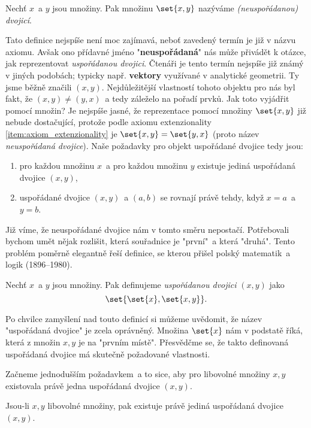 \begin{definition}
    Nechť $x$~a $y$ jsou množiny. Pak množinu $\set{x,y}$ nazýváme \emph{(neuspořádanou) dvojicí}.
\end{definition}
Tato definice nejspíše není moc zajímavá, neboť zavedený termín je již v názvu axiomu. Avšak ono přídavné jméno "\textbf{neuspořádaná}" nás může přivádět k otázce, jak reprezentovat \emph{uspořádanou dvojici}. Čtenáři je tento termín nejspíše již známý v jiných podobách; typicky např. \textbf{vektory} využívané v analytické geometrii. Ty jsme běžně značili $(x,y)$. Nejdůležitější vlastností tohoto objektu pro nás byl fakt, že $(x,y)\neq (y,x)$~a tedy záleželo na pořadí prvků. Jak toto vyjádřit pomocí množin? Je nejspíše jasné, že reprezentace pomocí množiny $\set{x,y}$ již nebude dostačující, protože podle axiomu extenzionality \ref{item:axiom_extenzionality} je $\set{x,y}=\set{y,x}$ (proto název \emph{neuspořádaná dvojice}). Naše požadavky pro objekt uspořádané dvojice tedy jsou:
\begin{enumerate}
    \item pro každou množinu $x$~a pro každou množinu $y$ existuje jediná uspořádaná dvojice $(x,y)$,
    \item uspořádané dvojice $(x,y)$~a $(a,b)$ se rovnají právě tehdy, když $x=a$~a $y=b$.
\end{enumerate}
Již víme, že neuspořádané dvojice nám v tomto směru nepostačí. Potřebovali bychom umět nějak rozlišit, která souřadnice je "první"~a která "druhá". Tento problém poměrně elegantně řeší definice, se kterou přišel polský matematik~a logik  (1896--1980).
\begin{definition}\label{def:usporadana_dvojice}
    Nechť $x$~a $y$ jsou množiny. Pak definujeme \emph{uspořádanou dvojici} $(x,y)$ jako
    \begin{equation*}
        \set{\set{x},\set{x,y}}.
    \end{equation*}
\end{definition}
Po chvilce zamyšlení nad touto definicí si můžeme uvědomit, že název "uspořádaná dvojice" je zcela oprávněný. Množina $\set{x}$ nám v podstatě  říká, která z množin $x,y$ je na "prvním místě". Přesvědčme se, že takto definovaná uspořádaná dvojice má skutečně požadované vlastnosti.\par
Začneme jednodušším požadavkem~a to sice, aby pro libovolné množiny $x,y$ existovala právě jedna uspořádaná dvojice $(x,y)$.
\begin{lemma}
    Jsou-li $x,y$ libovolné množiny, pak existuje právě jediná uspořádaná dvojice $(x,y)$.
\end{lemma}
